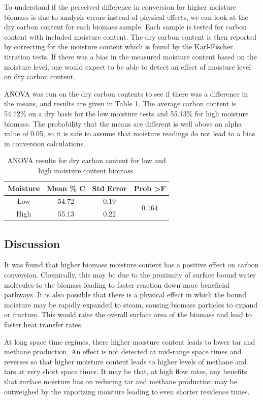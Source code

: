 \documentclass[11pt,twocolumn]{article}
\begin{document}
To understand if the perceived difference in conversion for higher moisture biomass is due to analysis errors instead of physical effects, we can look at the dry carbon content for each biomass sample.  Each sample is tested for carbon content with included moisture content.  The dry carbon content is then reported by correcting for the moisture content which is found by the Karl-Fischer titration tests.  If there was a bias in the measured moisture content based on the moisture level, one would expect to be able to detect an effect of moisture level on dry carbon content.

ANOVA was run on the dry carbon contents to see if there was a difference in the means, and results are given in Table \ref{anova_moist}.  The average carbon content is 54.72\% on a dry basis for the low moisture tests and 55.13\% for high moisture biomass.  The probability that the means are different is well above an alpha value of 0.05, so it is safe to assume that moisture readings do not lead to a bias in conversion calculations.

\begin{table}
	\centering
	\caption{ANOVA results for dry carbon content for low and high moisture content biomass.}
	\label{anova_moist}
	\begin{tabular}{cccc}
	\toprule
	Moisture	& 	Mean \% C &  	Std Error	&	Prob \textgreater F \\
	\midrule
	Low		&	54.72	&	0.19		& 	\multirow{2}{*}{0.164}	\\
	High		&	55.13	&	0.22		& {} \\
	\bottomrule
	\end{tabular}
\end{table}

\subsection*{Discussion}

It was found that higher biomass moisture content has a positive effect on carbon conversion.  Chemically, this may be due to the proximity of surface bound water molecules to the biomass leading to faster reaction down more beneficial pathways.  It is also possible that there is a physical effect in which the bound moisture may be rapidly expanded to steam, causing biomass particles to expand or fracture.  This would raise the overall surface area of the biomass and lead to faster heat transfer rates.

At long space time regimes, there higher moisture content leads to lower tar and methane production.  An effect is not detected at mid-range space times and reverses so that higher moisture content leads to higher levels of methane and tars at very short space times.  It may be that,  at high flow rates, any benefits that surface moisture has on reducing tar and methane production may be outweighed by the vaporizing moisture leading to even shorter residence times.
\end{document}
